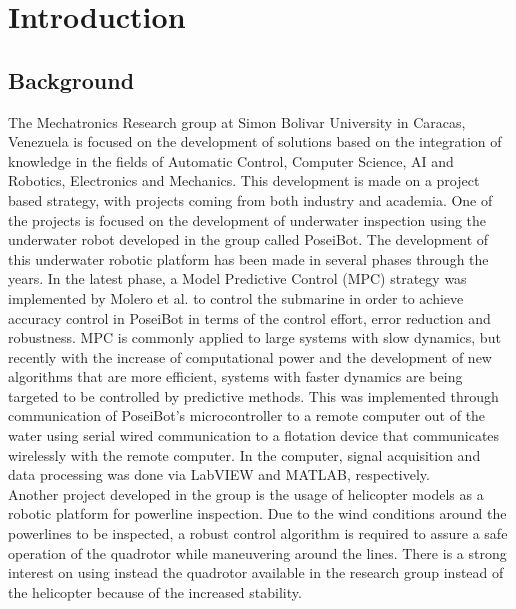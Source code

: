 \chapter{Introduction}
\label{chap:Introduction}
%
%
%
%

\section{Background}

The Mechatronics Research group at Simon Bolivar University in Caracas, Venezuela is focused on the development of solutions based on the integration of knowledge in the fields of Automatic Control, Computer Science, AI and Robotics, Electronics and Mechanics. This development is made on a project based strategy, with projects coming from both industry and academia. One of the projects is focused on the development of underwater inspection using the underwater robot developed in the group called PoseiBot. The development of this underwater robotic platform has been made in several phases through the years. In the latest phase, a Model Predictive Control (MPC) strategy was implemented by Molero et al. \cite{Molero2011} to control the submarine in order to achieve accuracy control in PoseiBot in terms of the control effort, error reduction and robustness. MPC is commonly applied to large systems with slow dynamics, but recently with the increase of computational power and the development of new algorithms that are more efficient, systems with faster dynamics are being targeted to be controlled by predictive methods. This was implemented through communication of PoseiBot's microcontroller to a remote computer out of the water using serial wired communication to a flotation device that communicates wirelessly with the remote computer. In the computer, signal acquisition  and data processing was done via LabVIEW \texttrademark  and MATLAB\textsuperscript{\textregistered}, respectively. \\

Another project developed in the group is the usage of helicopter models as a robotic platform for powerline inspection. Due to the wind conditions around the powerlines to be inspected, a robust control algorithm is required to assure a safe operation of the quadrotor while maneuvering around the lines. There is a strong interest on using instead the quadrotor available in the research group instead of the helicopter because of the increased stability. \\

